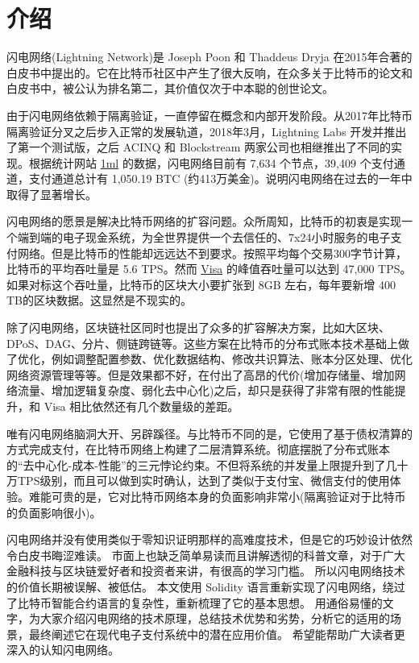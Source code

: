 \section{介绍}

闪电网络(Lightning Network)是 Joseph Poon 和 Thaddeus Dryja 在2015年合著的白皮书中提出的。它在比特币社区中产生了很大反响，在众多关于比特币的论文和白皮书中，被公认为排名第二，其价值仅次于中本聪的创世论文。

由于闪电网络依赖于隔离验证，一直停留在概念和内部开发阶段。从2017年比特币隔离验证分叉之后步入正常的发展轨道，2018年3月，Lightning Labs 开发并推出了第一个测试版，之后 ACINQ 和 Blockstream 两家公司也相继推出了不同的实现。根据统计网站  \href{https://1ml.com/statistics}{1ml} 的数据，闪电网络目前有 7,634 个节点，39,409 个支付通道，支付通道总计有 1,050.19 BTC (约413万美金)。说明闪电网络在过去的一年中取得了显著增长。

闪电网络的愿景是解决比特币网络的扩容问题。众所周知，比特币的初衷是实现一个端到端的电子现金系统，为全世界提供一个去信任的、7x24小时服务的电子支付网络。但是比特币的性能却远远达不到要求。按照平均每个交易300字节计算，比特币的平均吞吐量是 5.6 TPS。然而 \href{https://www.visa.com/blogarchives/us/2013/10/10/stress-test-prepares-visanet-for-the-most-wonderful-time-of-the-year/index.html}{Visa} 的峰值吞吐量可以达到 47,000 TPS。如果对标这个吞吐量，比特币的区块大小要扩张到 8GB 左右，每年要新增 400 TB的区块数据。这显然是不现实的。

除了闪电网络，区块链社区同时也提出了众多的扩容解决方案，比如大区块、DPoS、DAG、分片、侧链跨链等。这些方案在比特币的分布式账本技术基础上做了优化，例如调整配置参数、优化数据结构、修改共识算法、账本分区处理、优化网络资源管理等等。但是效果都不好，在付出了高昂的代价(增加存储量、增加网络流量、增加逻辑复杂度、弱化去中心化)之后，却只是获得了非常有限的性能提升，和 Visa 相比依然还有几个数量级的差距。

唯有闪电网络脑洞大开、另辟蹊径。与比特币不同的是，它使用了基于债权清算的方式完成支付，在比特币网络上构建了二层清算系统。彻底摆脱了分布式账本的“去中心化-成本-性能”的三元悖论约束。不但将系统的并发量上限提升到了几十万TPS级别，而且可以做到实时确认，达到了类似于支付宝、微信支付的使用体验。难能可贵的是，它对比特币网络本身的负面影响非常小(隔离验证对于比特币的负面影响很小)。

闪电网络并没有使用类似于零知识证明那样的高难度技术，但是它的巧妙设计依然令白皮书晦涩难读。
市面上也缺乏简单易读而且讲解透彻的科普文章，对于广大金融科技与区块链爱好者和投资者来讲，有很高的学习门槛。
所以闪电网络技术的价值长期被误解、被低估。
本文使用 Solidity 语言重新实现了闪电网络，绕过了比特币智能合约语言的复杂性，重新梳理了它的基本思想。
用通俗易懂的文字，为大家介绍闪电网络的技术原理，总结技术优势和劣势，分析它的适用的场景，最终阐述它在现代电子支付系统中的潜在应用价值。
希望能帮助广大读者更深入的认知闪电网络。

